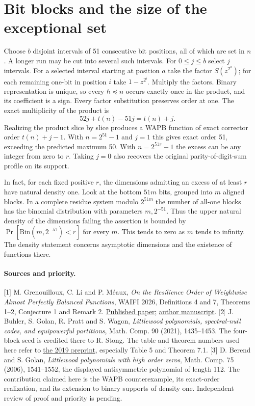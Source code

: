 \documentclass[11pt]{article}
\begin{document}
\section{Bit blocks and the size of the exceptional set}
Choose $b$ disjoint intervals of 51 consecutive bit positions, all of which are set in $n$. A longer run may be cut into several such intervals. For $0\le j\le b$ select $j$ intervals. For a selected interval starting at position $a$ take the factor $S(z^{2^a})$; for each remaining one-bit in position $i$ take $1-z^{2^i}$. Multiply the factors. Binary representation is unique, so every $h\preceq n$ occurs exactly once in the product, and its coefficient is a sign. Every factor substitution preserves order at one. The exact multiplicity of the product is
\[
52j+t(n)-51j=t(n)+j.
\]
Realizing the product slice by slice produces a WAPB function of exact corrector order $t(n)+j-1$. With $n=2^{51}-1$ and $j=1$ this gives exact order 51, exceeding the predicted maximum 50. With $n=2^{51r}-1$ the excess can be any integer from zero to $r$. Taking $j=0$ also recovers the original parity-of-digit-sum profile on its support.

In fact, for each fixed positive $r$, the dimensions admitting an excess of at least $r$ have natural density one. Look at the bottom $51m$ bits, grouped into $m$ aligned blocks. In a complete residue system modulo $2^{51m}$ the number of all-one blocks has the binomial distribution with parameters $m,2^{-51}$. Thus the upper natural density of the dimensions failing the assertion is bounded by $\Pr[\mathrm{Bin}(m,2^{-51})<r]$ for every $m$. This tends to zero as $m$ tends to infinity. The density statement concerns asymptotic dimensions and the existence of functions there.

\paragraph{Sources and priority.}
[1] M. Grenouilloux, C. Li and P. M\'eaux, \emph{On the Resilience Order of Weightwise Almost Perfectly Balanced Functions}, WAIFI 2026, Definitions 4 and 7, Theorems 1--2, Conjecture 1 and Remark 2. \href{https://doi.org/10.1007/978-3-032-27574-5_13}{Published paper}; \href{https://orbilu.uni.lu/handle/10993/68301}{author manuscript}.
[2] J. Buhler, S. Golan, R. Pratt and S. Wagon, \emph{Littlewood polynomials, spectral-null codes, and equipowerful partitions}, Math. Comp. 90 (2021), 1435--1453. The four-block seed is credited there to R. Stong. The table and theorem numbers used here refer to \href{https://arxiv.org/abs/1912.03491v1}{the 2019 preprint}, especially Table 5 and Theorem 7.1.
[3] D. Berend and S. Golan, \emph{Littlewood polynomials with high order zeros}, Math. Comp. 75 (2006), 1541--1552, the displayed antisymmetric polynomial of length 112. The contribution claimed here is the WAPB counterexample, its exact-order realization, and its extension to binary supports of density one. Independent review of proof and priority is pending.
\end{document}
